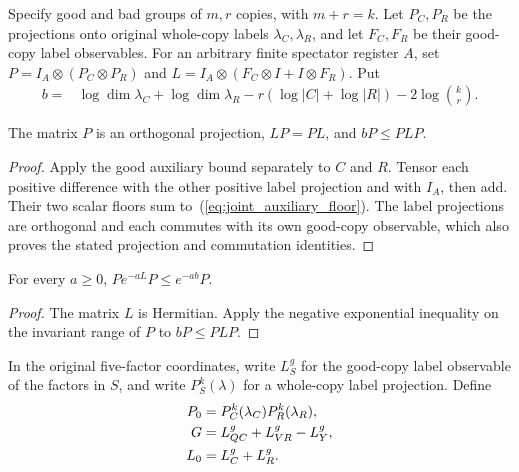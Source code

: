 Specify good and bad groups of $m,r$ copies, with $m+r=k$.
Let $P_C,P_R$ be the projections onto original whole-copy labels
$\lambda_C,\lambda_R$, and let $F_C,F_R$ be their good-copy label
observables. For an arbitrary finite spectator register $A$, set
$P=I_A\otimes(P_C\otimes P_R)$ and
$L=I_A\otimes(F_C\otimes I+I\otimes F_R)$. Put
\begin{align}
  b={}&\log\dim\lambda_C+\log\dim\lambda_R
       -r(\log|C|+\log|R|)-2\log\binom{k}{r}.
  \label{eq:joint_auxiliary_floor}
\end{align}

\begin{theorem}
  \label{thm:joint_auxiliary_entropy_floor}
  \leanok
  The matrix $P$ is an orthogonal projection, $LP=PL$, and $bP\leq PLP$.
\end{theorem}
\begin{proof}
  \leanok
  Apply the good auxiliary bound separately to $C$ and $R$.
  Tensor each positive difference with the other positive label
  projection and with $I_A$, then add. Their two scalar floors sum
  to~(\ref{eq:joint_auxiliary_floor}). The label projections are
  orthogonal and each commutes with its own good-copy observable,
  which also proves the stated projection and commutation identities.
\end{proof}

\begin{theorem}
  \label{thm:joint_auxiliary_exponential_bound}
  \leanok
  For every $a\geq0$, $Pe^{-aL}P\leq e^{-ab}P$.
\end{theorem}
\begin{proof}
  \leanok
  The matrix $L$ is Hermitian. Apply the negative exponential
  inequality on the invariant range of $P$ to $bP\leq PLP$.
\end{proof}

In the original five-factor coordinates, write $L^g_S$ for the
good-copy label observable of the factors in $S$, and write $P^k_S(\lambda)$
for a whole-copy label projection. Define
\begin{align}
  P_0&=P^k_C(\lambda_C)P^k_R(\lambda_R),\notag\\
  G&=L^g_{QC}+L^g_{VR}-L^g_Y,\notag\\
  L_0&=L^g_C+L^g_R.
  \label{eq:joint_auxiliary_observables}
\end{align}

